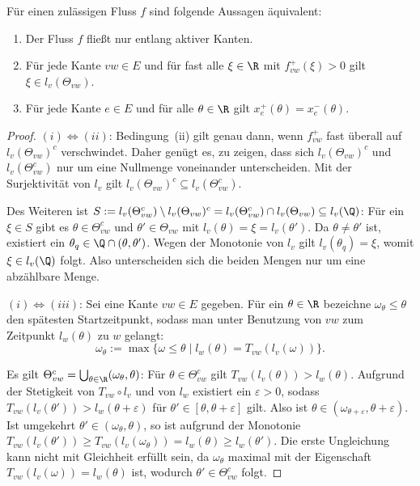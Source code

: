 \begin{lemma}\label{lemma-only-active-edges}
	Für einen zulässigen Fluss $f$ sind folgende Aussagen äquivalent:
	\begin{enumerate}[label=(\roman*)]
		\item Der Fluss $f$ fließt nur entlang aktiver Kanten.
		\item Für jede Kante $vw\in E$ und für fast alle $\xi\in\R$ mit	$f_{vw}^+(\xi)>0$ gilt $\xi \in l_v(\Theta_{vw})$.
		\item Für jede Kante $e\in E$ und für alle $\theta\in\R$ gilt $x_e^+(\theta) = x_e^-(\theta)$.
	\end{enumerate}
\end{lemma}
\begin{proof}
	$(i) \Leftrightarrow (ii)$: Bedingung~(ii) gilt genau dann, wenn $f_{vw}^+$ fast überall auf $l_v(\Theta_{vw})^c$ verschwindet.
	Daher genügt es, zu zeigen, dass sich $l_v(\Theta_{vw})^c$ und $l_v(\Theta_{vw}^c)$ nur um eine Nullmenge voneinander unterscheiden.
	Mit der Surjektivität von $l_v$ gilt $l_v(\Theta_{vw})^c\subseteq l_v(\Theta_{vw}^c)$.
	
	Des Weiteren ist $S:=l_v(\Theta_{vw}^c)\setminus l_v(\Theta_{vw})^c = l_v(\Theta_{vw}^c)\cap l_v(\Theta_{vw})\subseteq l_v(\Q)$:
	Für ein $\xi\in S$ gibt es $\theta\in\Theta_{vw}^c$ und $\theta'\in\Theta_{vw}$ mit $l_v(\theta)=\xi=l_v(\theta')$.
	Da $\theta\neq\theta'$ ist, existiert ein $\theta_q\in\Q\cap(\theta,\theta')$.
	Wegen der Monotonie von $l_v$ gilt $l_v(\theta_q)=\xi$, womit $\xi\in l_v(\Q)$ folgt.
	Also unterscheiden sich die beiden Mengen nur um eine abzählbare Menge.
	
	$(i)\Leftrightarrow (iii)$: Sei eine Kante $vw\in E$ gegeben.
	Für ein $\theta\in\R$ bezeichne $\omega_\theta\leq \theta$ den spätesten Startzeitpunkt, sodass man unter Benutzung von $vw$ zum Zeitpunkt $l_w(\theta)$ zu $w$ gelangt:
	\[ \omega_\theta:=\max\{ \omega\leq\theta \mid l_w(\theta) = T_{vw}(l_v(\omega)) \}. \]
	
	Es gilt $\Theta_{vw}^c = \bigcup_{\theta\in\R} (\omega_\theta, \theta)$:
	Für $\theta\in\Theta_{vw}^c$ gilt $T_{vw}(l_v(\theta)) > l_w(\theta)$.
	Aufgrund der Stetigkeit von $T_{vw}\circ l_v$ und von $l_w$ existiert ein $\varepsilon>0$, sodass $T_{vw}(l_v(\theta')) > l_w(\theta+\varepsilon)$ für $\theta'\in[\theta,\theta+\varepsilon]$ gilt.
	Also ist $\theta\in(\omega_{\theta+\varepsilon}, \theta+\varepsilon)$.
	Ist umgekehrt $\theta'\in (\omega_\theta,\theta)$, so ist aufgrund der Monotonie $T_{vw}(l_v(\theta'))\geq T_{vw}(l_v(\omega_\theta)) = l_w(\theta)\geq l_w(\theta')$.
	Die erste Ungleichung kann nicht mit Gleichheit erfüllt sein, da $\omega_\theta$ maximal mit der Eigenschaft $T_{vw}(l_v(\omega)) = l_w(\theta)$ ist, wodurch $\theta'\in\Theta_{vw}^c$ folgt.
	

\end{proof}
